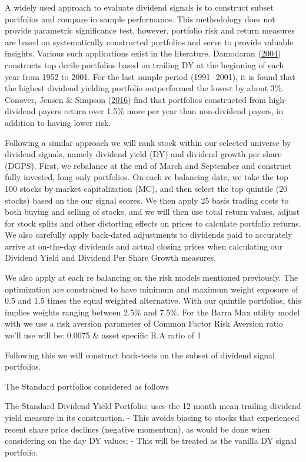 \documentclass[11pt,preprint, authoryear]{elsarticle}
\numberwithin{equation}{section}
\numberwithin{figure}{section}
\numberwithin{table}{section}
\begin{document}
A widely used approach to evaluate dividend signals is to construct
subset portfolios and compare in sample performance. This methodology
does not provide parametric significance test, however, portfolio risk
and return measures are based on systematically constructed portfolios
and serve to provide valuable insights. Various such applications exist
in the literature. Damodaran
(\protect\hyperlink{ref-damodaran2004investment}{2004}) constructs top
decile portfolios based on trailing DY at the beginning of each year
from 1952 to 2001. For the last sample period (1991 -2001), it is found
that the highest dividend yielding portfolio outperformed the lowest by
about 3\%. Conover, Jensen \& Simpson
(\protect\hyperlink{ref-conover2016difference}{2016}) find that
portfolios constructed from high-dividend payers return over 1.5\% more
per year than non-dividend payers, in addition to having lower risk.

Following a similar approach we will rank stock within our selected
universe by dividend signals, namely dividend yield (DY) and dividend
growth per share (DGPS). First, we rebalance at the end of March and
September and construct fully invested, long only portfolios. On each re
balancing date, we take the top 100 stocks by market capitalization
(MC), and then select the top quintile (20 stocks) based on the our
signal scores. We then apply 25 basis trading costs to both buying and
selling of stocks, and we will then use total return values, adjust for
stock splits and other distorting effects on prices to calculate
portfolio returns. We also carefully apply back-dated adjustments to
dividends paid to accurately arrive at on-the-day dividends and actual
closing prices when calculating our Dividend Yield and Dividend Per
Share Growth measures.

We also apply at each re balancing on the risk models mentioned
previously. The optimization are constrained to have minimum and maximum
weight exposure of 0.5 and 1.5 times the equal weighted alternative.
With our quintile portfolios, this implies weights ranging between 2.5\%
and 7.5\%. For the Barra Max utility model with we use a risk aversion
parameter of Common Factor Risk Aversion ratio we'll use will be: 0.0075
\& asset specific R.A ratio of 1

Following this we will construct back-tests on the subset of dividend
signal portfolios.

The Standard portfolios considered as follows

The Standard Dividend Yield Portfolio: uses the 12 month mean trailing
dividend yield measure in its construction. - This avoids biasing to
stocks that experienced recent share price declines (negative momentum),
as would be done when considering on the day DY values; - This will be
treated as the vanilla DY signal portfolio.
\end{document}
